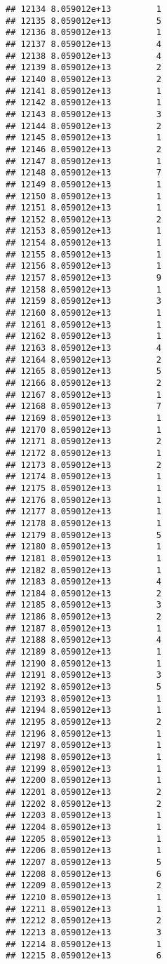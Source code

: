 \documentclass[
]{article}
\begin{document}
\begin{verbatim}
## 12134 8.059012e+13         1
## 12135 8.059012e+13         5
## 12136 8.059012e+13         1
## 12137 8.059012e+13         4
## 12138 8.059012e+13         4
## 12139 8.059012e+13         2
## 12140 8.059012e+13         2
## 12141 8.059012e+13         1
## 12142 8.059012e+13         1
## 12143 8.059012e+13         3
## 12144 8.059012e+13         2
## 12145 8.059012e+13         1
## 12146 8.059012e+13         2
## 12147 8.059012e+13         1
## 12148 8.059012e+13         7
## 12149 8.059012e+13         1
## 12150 8.059012e+13         1
## 12151 8.059012e+13         1
## 12152 8.059012e+13         2
## 12153 8.059012e+13         1
## 12154 8.059012e+13         1
## 12155 8.059012e+13         1
## 12156 8.059012e+13         1
## 12157 8.059012e+13         9
## 12158 8.059012e+13         1
## 12159 8.059012e+13         3
## 12160 8.059012e+13         1
## 12161 8.059012e+13         1
## 12162 8.059012e+13         1
## 12163 8.059012e+13         4
## 12164 8.059012e+13         2
## 12165 8.059012e+13         5
## 12166 8.059012e+13         2
## 12167 8.059012e+13         1
## 12168 8.059012e+13         7
## 12169 8.059012e+13         1
## 12170 8.059012e+13         1
## 12171 8.059012e+13         2
## 12172 8.059012e+13         1
## 12173 8.059012e+13         2
## 12174 8.059012e+13         1
## 12175 8.059012e+13         1
## 12176 8.059012e+13         1
## 12177 8.059012e+13         1
## 12178 8.059012e+13         1
## 12179 8.059012e+13         5
## 12180 8.059012e+13         1
## 12181 8.059012e+13         1
## 12182 8.059012e+13         1
## 12183 8.059012e+13         4
## 12184 8.059012e+13         2
## 12185 8.059012e+13         3
## 12186 8.059012e+13         2
## 12187 8.059012e+13         1
## 12188 8.059012e+13         4
## 12189 8.059012e+13         1
## 12190 8.059012e+13         1
## 12191 8.059012e+13         3
## 12192 8.059012e+13         5
## 12193 8.059012e+13         1
## 12194 8.059012e+13         1
## 12195 8.059012e+13         2
## 12196 8.059012e+13         1
## 12197 8.059012e+13         1
## 12198 8.059012e+13         1
## 12199 8.059012e+13         1
## 12200 8.059012e+13         1
## 12201 8.059012e+13         2
## 12202 8.059012e+13         2
## 12203 8.059012e+13         1
## 12204 8.059012e+13         1
## 12205 8.059012e+13         1
## 12206 8.059012e+13         1
## 12207 8.059012e+13         5
## 12208 8.059012e+13         6
## 12209 8.059012e+13         2
## 12210 8.059012e+13         1
## 12211 8.059012e+13         1
## 12212 8.059012e+13         2
## 12213 8.059012e+13         3
## 12214 8.059012e+13         1
## 12215 8.059012e+13         6

\end{verbatim}
\end{document}
